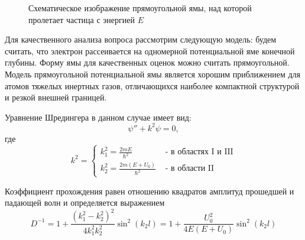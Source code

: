 \documentclass[12pt,a4paper]{article}
\begin{document}
\begin{figure} \label{problem} 
\vspace{7ex}
\caption{Схематическое изображение прямоугольной ямы, над которой пролетает частица с энергией $E$}
\end{figure}

Для качественного анализа вопроса рассмотрим следующую модель: будем считать, что электрон рассеивается на одномерной потенциальной яме конечной глубины. Фор­му ямы для качественных оценок можно считать пря­моугольной. Модель прямоугольной потенциальной ямы является хо­рошим приближением для атомов тяжелых инертных газов, отличаю­щихся наиболее компактной структурой и резкой внешней границей.

Уравнение Шредингера в данном случае имеет вид:
\begin{equation}
\psi'' + k^2 \psi = 0, 
\end{equation}
где
\begin{equation}
k^2 = 
\begin{cases}
k_1^2 = \frac{2mE}{\hbar^2} & \text{ - в областях I и III}\\
k_2^2 = \frac{2m(E+U_0)}{\hbar^2} & \text{ - в области II}
\end{cases}
\end{equation}

Коэффициент прохождения равен отношению квадратов амплитуд прошедшей и падающей волн и определяется выражением
\begin{equation}
D^{-1} = 1 + \frac{(k_1^2 - k_2^2)^2}{4k_1^2 k_2^2} \sin^2(k_2l) = 1 + \frac{U_0^2}{4E(E+U_0)} \sin^2(k_2l)
\end{equation}
\end{document}
